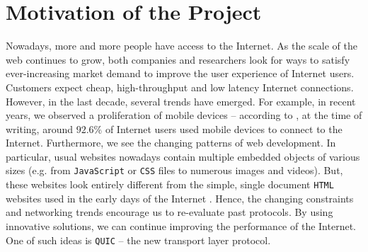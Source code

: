 \documentclass[12pt,a4paper,twoside,openright]{report}
\begin{document}
%









\section{Motivation of the Project}
Nowadays, more and more people have access to the Internet.
As the scale of the web continues to grow, both companies and researchers look for ways to satisfy ever-increasing market demand to improve the user experience of Internet users.
Customers expect cheap, high-throughput and low latency Internet connections.
However, in the last decade, several trends have emerged.
For example, in recent years, we observed a proliferation of mobile devices -- according to \cite{bib_number_of_mobile_users}, at the time of writing, around $92.6\%$ of Internet users used mobile devices to connect to the Internet.
Furthermore, we see the changing patterns of web development.
In particular, usual websites nowadays contain multiple embedded objects of various sizes (e.g. from \texttt{JavaScript} or \texttt{CSS} files to numerous images and videos)\cite{bib_Netdev_0x13_QUIC_Tutorial}.
But, these websites look entirely different from the simple, single document \texttt{HTML} websites used in the early days of the Internet \cite{RudmanRiaan2016DW3o}.
Hence, the changing constraints and networking trends encourage us to re-evaluate past protocols.
By using innovative solutions, we can continue improving the performance of the Internet. 
One of such ideas is \texttt{QUIC} -- the new transport layer protocol.
\end{document}
